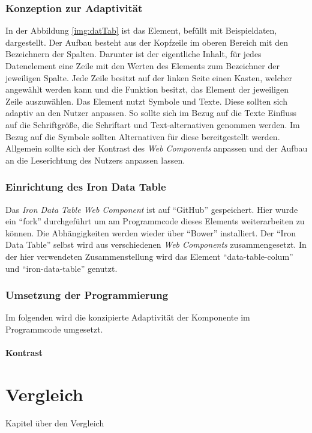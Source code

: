 \documentclass[12pt, paper=a4, bibtotoc, toc=listof, headsepline=true]{scrreprt}
\begin{document}
		\subsection{Konzeption zur Adaptivität}
		In der Abbildung \ref{img:datTab} ist das Element, befüllt mit Beispieldaten, dargestellt. Der Aufbau besteht aus der Kopfzeile im oberen Bereich mit den Bezeichnern der Spalten. Darunter ist der eigentliche Inhalt, für jedes Datenelement eine Zeile mit den Werten des Elements zum Bezeichner der jeweiligen Spalte. Jede Zeile besitzt auf der linken Seite einen Kasten, welcher angewählt werden kann und die Funktion besitzt, das Element der jeweiligen Zeile auszuwählen.
		\newline
		Das Element nutzt Symbole und Texte. Diese sollten sich adaptiv an den Nutzer anpassen. So sollte sich im Bezug auf die Texte Einfluss auf die Schriftgröße, die Schriftart und Text-alternativen genommen werden. Im Bezug auf die Symbole sollten Alternativen für diese bereitgestellt werden. Allgemein sollte sich der Kontrast des \emph{Web Components} anpassen und der Aufbau an die Leserichtung des Nutzers anpassen lassen.
		\subsection{Einrichtung des Iron Data Table}
		Das \emph{Iron Data Table Web Component} ist auf \enquote{GitHub} gespeichert. Hier wurde ein \enquote{fork} durchgeführt um am Programmcode dieses Elements weiterarbeiten zu können. Die Abhängigkeiten werden wieder über \enquote{Bower} installiert. Der \enquote{Iron Data Table} selbst wird aus verschiedenen \emph{Web Components} zusammengesetzt. In der hier verwendeten Zusammenstellung wird das Element \enquote{data-table-colum} und \enquote{iron-data-table} genutzt.  
		\subsection{Umsetzung der Programmierung}
		Im folgenden wird die konzipierte Adaptivität der Komponente im Programmcode umgesetzt.
		\subsubsection{Kontrast}

\chapter{Vergleich}
Kapitel über den Vergleich
	

	\printbibliography
\end{document}
